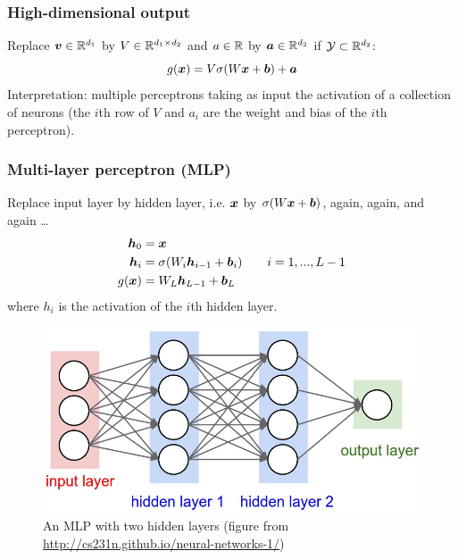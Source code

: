 \documentclass{beamer}
\begin{document}
\begin{frame}

\frametitle{High-dimensional output}

Replace ${\bm v} \in {\mathbb R}^{d_1}$ by $V \in {\mathbb R}^{d_1 \times d_2}$ and $a \in {\mathbb R}$ by ${\bm a} \in {\mathbb R}^{d_2}$ if ${\mathcal Y} \subset {\mathbb R}^{d_2}$:
\[
g({\bm x}) = V \sigma (W {\bm x} + {\bm b}) + {\bm a}
\]
Interpretation: multiple perceptrons taking as input the activation of a collection of neurons (the $i$th row of $V$ and $a_i$ are the weight and bias of the $i$th perceptron).

\end{frame}

\begin{frame}

\frametitle{Multi-layer perceptron (MLP)}

Replace input layer by hidden layer, i.e. ${\bm x}$ by $\sigma (W {\bm x} + {\bm b})$, again, again, and again \ldots
\begin{align*}
{\bm h}_0 & = {\bm x} \\
{\bm h}_i & = \sigma (W_i {\bm h}_{i - 1} + {\bm b}_i) \qquad i = 1, ..., L - 1 \\
g({\bm x}) & = W_L {\bm h}_{L - 1} + {\bm b}_L
\end{align*}
where $h_i$ is the activation of the $i$th hidden layer.

\begin{figure}
\centering
\includegraphics[scale=0.2, valign=t]{neural_net2}
\caption{An MLP with two hidden layers (figure from \url{http://cs231n.github.io/neural-networks-1/})}
\end{figure}

\end{frame}
\end{document}

